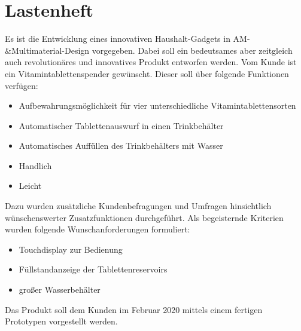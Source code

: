 
\chapter{Lastenheft}

Es ist die Entwicklung eines innovativen Haushalt-Gadgets in AM-\&Multimaterial-Design vorgegeben. Dabei soll ein bedeutsames aber zeitgleich auch revolutionäres und innovatives Produkt entworfen werden. Vom Kunde ist ein Vitamintablettenspender gewünscht. Dieser soll über folgende Funktionen verfügen:

\begin{itemize}
	\item Aufbewahrungsmöglichkeit für vier unterschiedliche Vitamintablettensorten
	\item Automatischer Tablettenauswurf in einen Trinkbehälter
	\item Automatisches Auffüllen des Trinkbehälters mit Wasser
	\item Handlich
	\item Leicht
\end{itemize}

Dazu wurden zusätzliche Kundenbefragungen und Umfragen hinsichtlich wünschenswerter Zusatzfunktionen durchgeführt. Als begeisternde Kriterien wurden folgende Wunschanforderungen formuliert:

\begin{itemize}
	\item Touchdisplay zur Bedienung
	\item Füllstandanzeige der Tablettenreservoirs
	\item großer Wasserbehälter
\end{itemize}

Das Produkt soll dem Kunden im Februar 2020 mittels einem fertigen Prototypen vorgestellt werden.